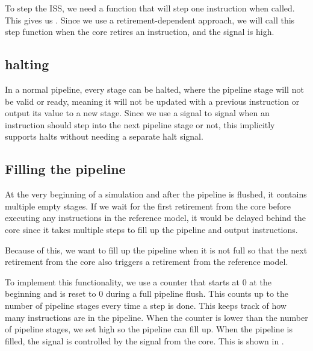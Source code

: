 To step the ISS, we need a function that will step one instruction when called. This gives us \textbf{}. Since we use a retirement-dependent approach, we will call this step function when the core retires an instruction, and the  signal is high. 

\subsection{halting}

In a normal pipeline, every stage can be halted, where the pipeline stage will not be valid or ready, meaning it will not be updated with a previous instruction or output its value to a new stage. Since we use a  signal to signal when an instruction should step into the next pipeline stage or not, this implicitly supports halts without needing a separate halt signal. 

\subsection{Filling the pipeline}

At the very beginning of a simulation and after the pipeline is flushed, it contains multiple empty stages. If we wait for the first retirement from the core before executing any instructions in the reference model, it would be delayed behind the core since it takes multiple steps to fill up the pipeline and output instructions. 

Because of this, we want to fill up the pipeline when it is not full so that the next retirement from the core also triggers a retirement from the reference model.

To implement this functionality, we use a  counter that starts at 0 at the beginning and is reset to 0 during a full pipeline flush. This counts up to the number of pipeline stages every time a step is done. This keeps track of how many instructions are in the pipeline. When the counter is lower than the number of pipeline stages, we set  high so the pipeline can fill up. When the pipeline is filled, the  signal is controlled by the  signal from the core. This is shown in .

